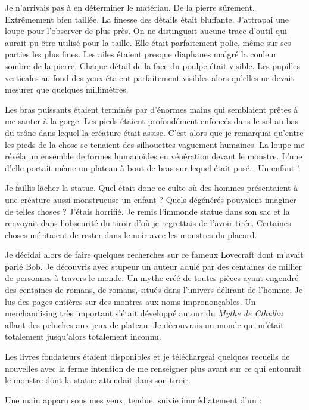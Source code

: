 Je n'arrivais pas à en déterminer le matériau. De la pierre sûrement. Extrêmement bien taillée. La finesse des détails
était bluffante. J'attrapai une loupe pour l'observer de plus près. On ne distinguait aucune trace d'outil qui aurait pu
être utilisé pour la taille. Elle était parfaitement polie, même sur ses parties les plus fines. Les ailes étaient
presque diaphanes malgré la couleur sombre de la pierre. Chaque détail de la face du poulpe était visible. Les pupilles
verticales au fond des yeux étaient parfaitement visibles alors qu'elles ne devait mesurer que quelques millimètres.

Les bras puissants étaient terminés par d'énormes mains qui semblaient prêtes à me sauter à la gorge. Les pieds étaient
profondément enfoncés dans le sol au bas du trône dans lequel la créature était assise. C'est alors que je remarquai
qu'entre les pieds de la chose se tenaient des silhouettes vaguement humaines. La loupe me révéla un ensemble de formes
humanoïdes en vénération devant le monstre. L'une d'elle portait même un plateau à bout de bras sur lequel était
posé\ldots{} Un enfant !

Je faillis lâcher la statue. Quel était donc ce culte où des hommes présentaient à une créature aussi monstrueuse un
enfant ? Quels dégénérés pouvaient imaginer de telles choses ? J'étais horrifié. Je remis l'immonde statue dans son sac
et la renvoyait dans l'obscurité du tiroir d'où je regrettais de l'avoir tirée. Certaines choses méritaient de rester
dans le noir avec les monstres du placard.

Je décidai alors de faire quelques recherches sur ce fameux Lovecraft dont m'avait parlé Bob. Je découvris avec stupeur
un auteur adulé par des centaines de millier de personnes à travers le monde. Un mythe créé de toutes pièces ayant
engendré des centaines de romans, de romans, situés dans l'univers délirant de l'homme. Je lus des pages entières sur
des montres aux noms imprononçables. Un merchandising très important s'était développé autour du \emph{Mythe de Cthulhu}
allant des peluches aux jeux de plateau. Je découvrais un monde qui m'était totalement jusqu'alors totalement inconnu.

Les livres fondateurs étaient disponibles et je téléchargeai quelques recueils de nouvelles avec la ferme intention de
me renseigner plus avant sur ce qui entourait le monstre dont la statue attendait dans son tiroir.

Une main apparu sous mes yeux, tendue, suivie immédiatement d'un :

